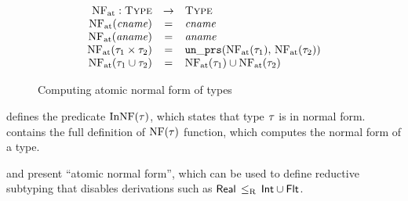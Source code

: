 \begin{figure}
	\[
	\begin{array}{rcl}
	\NFAt: \Type &\rightarrow& \Type \\
	\NFAt(\cname) &=& \cname \\
	\NFAt(\aname) &=& \aname \\
	\NFAt(\typair{\ty_1}{\ty_2}) &=& \unprs(\NFAt(\ty_1), \, \NFAt(\ty_2))	\\
	\NFAt(\tyunion{\ty_1}{\ty_2}) &=& \tyunion{\NFAt(\ty_1)}{\NFAt(\ty_2)} \\
	\end{array}
	\]
	\caption{Computing atomic normal form of \BetaJulia types}
	\label{fig:bjnom-calc-nf-full}
\end{figure}

 defines the predicate $\InNF(\ty)$, which states
that type $\ty$ is in normal form.
 contains the full definition of $\NF(\ty)$ 
function, which computes the normal form of a type.

 and  present 
``atomic normal form'', which can be used to define reductive subtyping
that disables derivations such as $\bjsubr{\tyreal}{\tyunion{\tyint}{\tyflt}}$.


